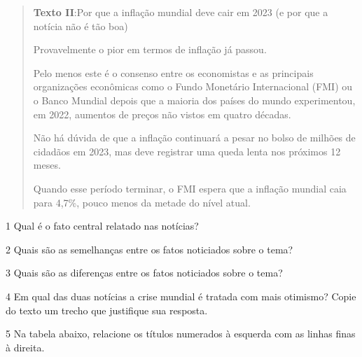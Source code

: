 \begin{quote}

\textbf{Texto II}:Por que a inflação mundial deve cair em 2023 (e por que a
notícia não é tão boa)

Provavelmente o pior em termos de inflação já passou.

Pelo menos este é o consenso entre os economistas e as principais
organizações econômicas como o Fundo Monetário Internacional (FMI) ou o
Banco Mundial depois que a maioria dos países do mundo experimentou, em
2022, aumentos de preços não vistos em quatro décadas.

Não há dúvida de que a inflação continuará a pesar no bolso de milhões
de cidadãos em 2023, mas deve registrar uma queda lenta nos próximos 12
meses.

Quando esse período terminar, o FMI espera que a inflação mundial caia
para 4,7\%, pouco menos da metade do nível atual. 

\end{quote}


\num{1} Qual é o fato central relatado nas notícias?


\num{2} Quais são as semelhanças entre os fatos noticiados sobre o tema?


\num{3} Quais são as diferenças entre os fatos noticiados sobre o tema?


\num{4} Em qual das duas notícias a crise mundial é tratada com mais otimismo?
Copie do texto um trecho que justifique sua resposta.


\num{5} Na tabela abaixo, relacione os títulos numerados à esquerda
com as linhas finas à direita.

